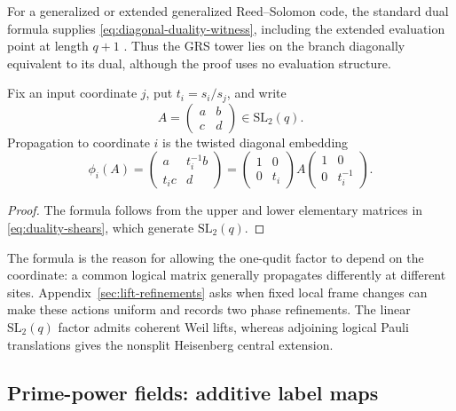\AMEFigureThree

For a generalized or extended generalized Reed--Solomon code, the
standard dual formula supplies \eqref{eq:diagonal-duality-witness}, including the extended
evaluation point at length \(q+1\)
\cite[Sections~5.2--5.3]{HuffmanPless2003}.  Thus the GRS tower lies on the
branch diagonally equivalent to its dual, although the proof uses no
evaluation structure.

\begin{proposition}
\label{prop:site-dependent-realization}
Fix an input coordinate \(j\), put \(t_i=s_i/s_j\), and write
\[
 A=\begin{pmatrix}a&b\\c&d\end{pmatrix}\in\mathrm{SL}_2(q).
\]
Propagation to coordinate \(i\) is the twisted diagonal embedding
\begin{equation}\label{eq:site-propagation}
 \phi_i(A)=
 \begin{pmatrix}a&t_i^{-1}b\\t_i c&d\end{pmatrix}
 =
 \begin{pmatrix}1&0\\0&t_i\end{pmatrix}
 A
 \begin{pmatrix}1&0\\0&t_i^{-1}\end{pmatrix}.
\end{equation}
\end{proposition}

\begin{proof}
The formula follows from the upper and lower elementary matrices in
\eqref{eq:duality-shears}, which generate \(\mathrm{SL}_2(q)\).
\end{proof}

The formula is the reason for allowing the one-qudit factor to depend on the
coordinate: a common logical matrix generally propagates differently at
different sites.  Appendix~\ref{sec:lift-refinements} asks when fixed local
frame changes can make these actions uniform and records two phase
refinements.  The linear
\(\mathrm{SL}_2(q)\) factor admits coherent Weil lifts, whereas adjoining
logical Pauli translations gives the nonsplit Heisenberg central extension.

\subsection{Prime-power fields: additive label maps}
\label{subsec:additive-labels}

